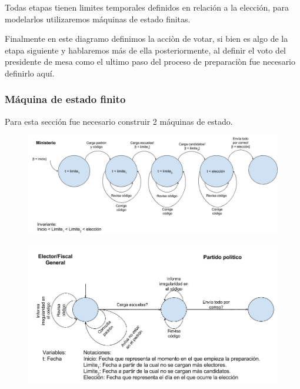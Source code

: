 Todas etapas tienen limites temporales definidos en relación a la elección, para modelarlos utilizaremos máquinas de estado finitas.

Finalmente en este diagramo definimos la acciòn de votar, si bien es algo de la etapa siguiente y hablaremos más de ella posteriormente, al definir el voto del presidente de mesa como el ultimo paso del proceso de preparaciòn fue necesario definirlo aquí.


\newpage
\subsubsection{Máquina de estado finito}

Para esta sección fue necesario construir 2 máquinas de estado.

\begin{figure}[h!]
\centering
\includegraphics[scale=0.45]{imagenes/FSMs/Preparacion/Fechaslimite1}
\end{figure}

\begin{figure}[h!]
\centering
\includegraphics[scale=0.45]{imagenes/FSMs/Preparacion/Fechaslimite2}
\end{figure}

